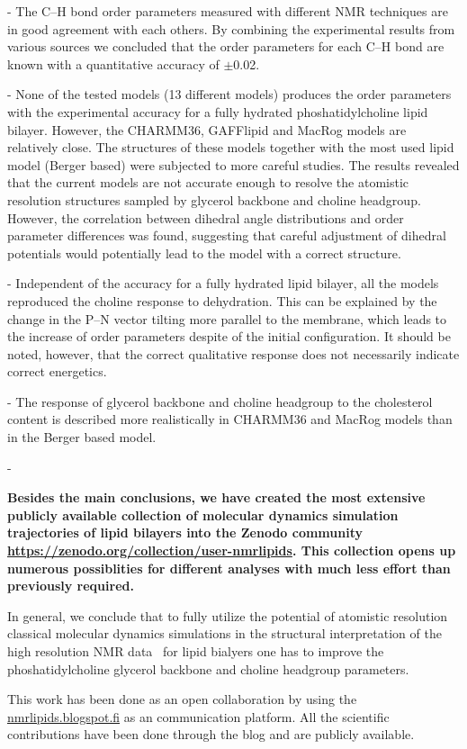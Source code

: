 \documentclass[pre,aps,floatfix,authordate1-4,twocolumn]{revtex4-1}
\begin{document}
- The C--H bond order parameters measured with different NMR techniques are in good agreement
with each others. By combining the experimental results from various sources we concluded
that the order parameters for each C--H bond are known with a quantitative accuracy of $\pm$0.02.

- None of the tested models (13 different models) produces the order parameters with the experimental
accuracy for a fully hydrated phoshatidylcholine lipid bilayer. However, the CHARMM36, GAFFlipid and MacRog 
models are relatively close. The structures of these models together with the most used lipid model (Berger based) 
were subjected to more careful studies. The results revealed that the current models are not accurate
enough to resolve the atomistic resolution structures sampled by glycerol backbone and choline headgroup.  
However, the correlation between dihedral angle distributions and order parameter differences was found, 
suggesting that careful adjustment of dihedral potentials would potentially lead to the model with a correct
structure.

- Independent of the accuracy for a fully hydrated lipid bilayer, all the models reproduced the choline response
to dehydration. This can be explained by the change in the P--N vector tilting more parallel to the membrane,
which leads to the increase of order parameters despite of the initial configuration. It should be noted, however,
that the correct qualitative response does not necessarily indicate correct energetics. 

- The response of glycerol backbone and choline headgroup to the cholesterol content is described more
realistically in CHARMM36 and MacRog models than in the Berger based model.

- {\bf Besides the main conclusions, we have created the most extensive
publicly available collection of molecular dynamics simulation trajectories of lipid bilayers
into the Zenodo community \url{https://zenodo.org/collection/user-nmrlipids}. 
This collection opens up numerous possiblities for different analyses with
much less effort than previously required.

In general, we conclude that to fully utilize the potential of atomistic resolution classical molecular dynamics simulations
in the structural interpretation of the high resolution NMR data~\cite{ferreira14} for lipid bialyers one has to  
improve the phoshatidylcholine glycerol backbone and choline headgroup parameters.

This work has been done as an open collaboration by using the \url{nmrlipids.blogspot.fi} as an communication
platform. All the scientific contributions have been done through the blog and are publicly
available. }
\end{document}
